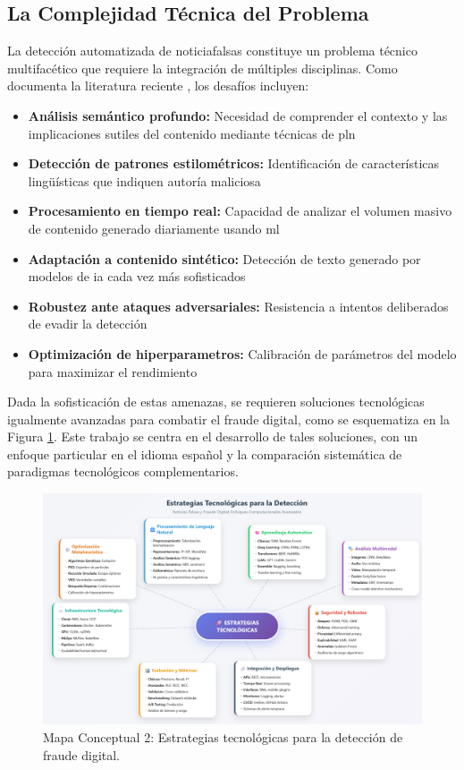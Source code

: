 \subsection{La Complejidad Técnica del Problema}

La detección automatizada de \glspl{noticiafalsa} constituye un problema técnico multifacético que requiere la integración de múltiples disciplinas. Como documenta la literatura reciente \cite{singh2023comprehensive}, los desafíos incluyen:

\begin{itemize}
    \item \textbf{Análisis semántico profundo:} Necesidad de comprender el contexto y las implicaciones sutiles del contenido mediante técnicas de \gls{pln}
    \item \textbf{Detección de patrones estilométricos:} Identificación de características lingüísticas que indiquen autoría maliciosa \cite{tsai2023stylometric}
    \item \textbf{Procesamiento en tiempo real:} Capacidad de analizar el volumen masivo de contenido generado diariamente usando \gls{ml}
    \item \textbf{Adaptación a contenido sintético:} Detección de texto generado por modelos de \gls{ia} cada vez más sofisticados \cite{su2023adapting}
    \item \textbf{Robustez ante ataques adversariales:} Resistencia a intentos deliberados de evadir la detección
    \item \textbf{Optimización de \glspl{hiperparametro}:} Calibración de parámetros del modelo para maximizar el rendimiento
\end{itemize}

Dada la sofisticación de estas amenazas, se requieren soluciones tecnológicas igualmente avanzadas para combatir el fraude digital, como se esquematiza en la Figura \ref{fig:mapa_soluciones}. Este trabajo se centra en el desarrollo de tales soluciones, con un enfoque particular en el idioma español y la comparación sistemática de paradigmas tecnológicos complementarios.

\begin{figure}[h!]
    \centering
    \includegraphics[width=\textwidth]{Imagenes/mapaConceptual2.png}
    \caption{Mapa Conceptual 2: Estrategias tecnológicas para la detección de fraude digital.}
    \label{fig:mapa_soluciones}
\end{figure}

